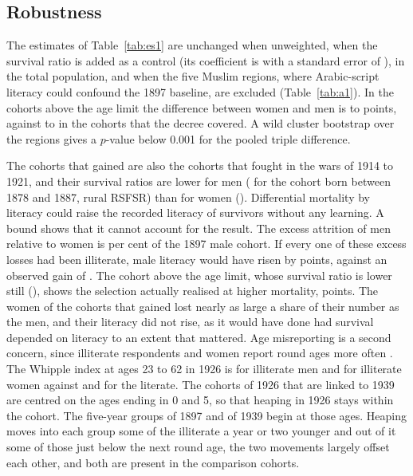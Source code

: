 \subsection{Robustness}\label{sec:robust1}

The estimates of Table~\ref{tab:es1} are unchanged when unweighted, when the survival ratio is added as a control (its coefficient is  with a standard error of ), in the total population, and when the five Muslim regions, where Arabic-script literacy could confound the 1897 baseline, are excluded (Table~\ref{tab:a1}). In the cohorts above the age limit the difference between women and men is  to  points, against  to  in the cohorts that the decree covered. A wild cluster bootstrap over the  regions gives a $p$-value below 0.001 for the pooled triple difference.

The cohorts that gained are also the cohorts that fought in the wars of 1914 to 1921, and their survival ratios are lower for men ( for the cohort born between 1878 and 1887, rural RSFSR) than for women (). Differential mortality by literacy could raise the recorded literacy of survivors without any learning. A bound shows that it cannot account for the result. The excess attrition of men relative to women is  per cent of the 1897 male cohort. If every one of these excess losses had been illiterate, male literacy would have risen by  points, against an observed gain of . The cohort above the age limit, whose survival ratio is lower still (), shows the selection actually realised at higher mortality,  points. The women of the cohorts that gained lost nearly as large a share of their number as the men, and their literacy did not rise, as it would have done had survival depended on literacy to an extent that mattered. Age misreporting is a second concern, since illiterate respondents and women report round ages more often \citep{ahearn2009}. The Whipple index at ages 23 to 62 in 1926 is  for illiterate men and  for illiterate women against  and  for the literate. The cohorts of 1926 that are linked to 1939 are centred on the ages ending in 0 and 5, so that heaping in 1926 stays within the cohort. The five-year groups of 1897 and of 1939 begin at those ages. Heaping moves into each group some of the illiterate a year or two younger and out of it some of those just below the next round age, the two movements largely offset each other, and both are present in the comparison cohorts.

